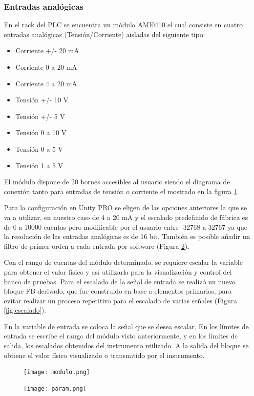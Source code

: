 \subsubsection{Entradas analógicas}
En el rack del PLC se encuentra un módulo AMI0410 el cual consiste en cuatro entradas analógicas (Tensión/Corriente) aisladas del siguiente tipo:
\begin{itemize}
	\item Corriente +/- 20 mA
\item 	Corriente 0 a 20 mA
\item 	Corriente 4 a 20 mA
\item 	Tensión +/- 10 V
\item 	Tensión +/- 5 V
\item 	Tensión 0 a 10 V
\item 	Tensión 0 a 5 V
\item 	Tensión 1 a 5 V
	
\end{itemize}

El módulo dispone de 20 bornes accesibles al usuario siendo el diagrama de conexión tanto para entradas de tensión o corriente el mostrado en la figura \ref{fig:modulo}.

Para la configuración en Unity PRO se eligen de las opciones anteriores la que se va a utilizar, en nuestro caso de 4 a 20 mA y el escalado predefinido de fábrica es de 0 a 10000 cuentas pero modificable por el usuario entre -32768 a 32767 ya que la resolución de las entradas analógicas es de 16 bit. También es posible añadir un filtro de primer orden a cada entrada por software (Figura \ref{fig:param}).

Con el rango de cuentas del módulo determinado, se requiere escalar la variable para obtener el valor físico y así utilizarla para la visualización y control del banco de pruebas.
Para el escalado de la señal de entrada se realizó un nuevo bloque FB derivado, que fue construido en base a elementos primarios, para evitar realizar un proceso repetitivo para el escalado de varias señales (Figura \ref{fig:escalado}).

En la variable de entrada se coloca la señal que se desea escalar. En los límites de entrada se escribe el rango del módulo visto anteriormente, y en los límites de salida, los escalados obtenidos del instrumento utilizado. A la salida del bloque se obtiene el valor físico visualizado o transmitido por el instrumento.

\begin{figure}[H]
	\centering
	\texttt{[image: modulo.png]}
	\label{fig:modulo}
\end{figure}
\begin{figure}[H]
	\centering
	\texttt{[image: param.png]}
	\label{fig:param}
\end{figure}

